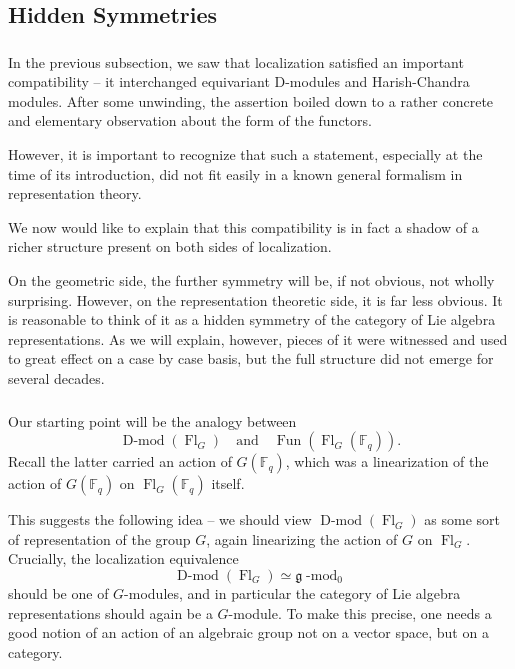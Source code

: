 \documentclass[10pt]{amsart}
\newcommand{\sB}{\on{Fl}_G}
\newcommand{\fg}{\mathfrak{g}}
\newcommand{\on}{\operatorname}
\renewcommand{\mod}{\on{-mod}}
\newcommand{\Dmod}{\on{D-mod}}
\newcommand{\Fq}{\mathbb{F}_q}
\newcommand{\Fun}{\on{Fun}}
\theoremstyle{remark}
\numberwithin{equation}{section}
\renewcommand{\mod}{\operatorname{-mod}}
\begin{document}
	\fi
	
	\subsection{Hidden Symmetries}
	
	\subsubsection{} In the previous subsection, we saw that localization 
	satisfied an important compatibility -- it interchanged equivariant 
	D-modules and Harish-Chandra modules. After some 
	unwinding, the assertion boiled down to a rather concrete and 
	elementary observation about the form of the functors.
	
	However, it is important to recognize that such a statement, especially at 
	the time of its introduction, did not fit easily in a known general 
	formalism in representation theory. 



	We now would like to explain that this compatibility is in fact a shadow of 
	 a richer structure present on both sides of localization.
	
	 On the 
	geometric side, the further symmetry will be, if not obvious, not 
	wholly surprising. However, on the representation theoretic side, it is far 
	less obvious. It is reasonable to think of it as a hidden symmetry of the 
	category of Lie algebra representations. As we will explain, however, 
	pieces of it were witnessed and used to great effect on a case by case 
	basis, but the full structure did not emerge for several decades. 
	
	\subsubsection{} Our starting point will be the analogy between 
	\[
	   \Dmod(\sB) \quad \text{and} \quad \Fun(\sB(\Fq)). 
	\]
	Recall the latter carried an action of $G(\Fq)$, which was a linearization  
	of the action of $G(\Fq)$ on $\sB(\Fq)$ itself.
	
	 
	This suggests the following idea -- we should view $\Dmod(\sB)$ as some sort 
	of representation of the group $G$, again linearizing the action of $G$ on 
	$\sB$. Crucially, the localization equivalence 
	\[
	    \Dmod(\sB) \simeq \fg\mod_0
	\]
	should be one of $G$-modules, and 
	in particular the category of Lie algebra representations should again be a 
	$G$-module. To make this precise, one needs a good notion of an action of 
	an algebraic group not on a vector space, but on a category. 
	
\end{document}
